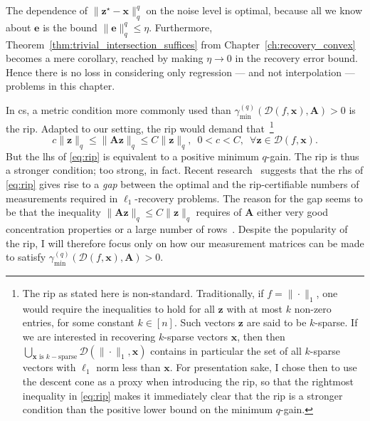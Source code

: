 The dependence of $\|\mathbf{z}^\star - \mathbf{x}\|_q^q$ on the noise level is optimal, because all we know about $\mathbf{e}$ is the bound $\|\mathbf{e}\|_q^{q} \leq \eta$. Furthermore, Theorem~\ref{thm:trivial_intersection_suffices} from Chapter~\ref{ch:recovery_convex} becomes a mere corollary, reached by making $\eta \to 0$ in the recovery error bound. Hence there is no loss in considering only regression --- and not interpolation --- problems in this chapter.

In \acrlong{cs}, a metric condition more commonly used than $\gamma_{\min}^{(q)} \left ( \mathcal{D}( f, \mathbf{x}), \mathbf{A} \right ) > 0$ is the \acrfull{rip}. Adapted to our setting, the \acrshort{rip} would demand that~\footnote{The \acrshort{rip} as stated here is non-standard. Traditionally, if $f = \|\cdot\|_1$, one would require the inequalities to hold for all $\mathbf{z}$ with at most $k$ non-zero entries, for some constant $k \in [n]$. Such vectors $\mathbf{z}$ are said to be $k$-sparse. If we are interested in recovering $k$-sparse vectors $\mathbf{x}$, then then $\bigcup_{\mathbf{x} \text{ is }k-\text{sparse}} \mathcal{D}( \| \cdot \|_1, \mathbf{x})$ contains in particular the set of all $k$-sparse vectors with $\ell_1$ norm less than $\mathbf{x}$. For presentation sake, I chose then to use the descent cone as a proxy when introducing the \acrshort{rip}, so that the rightmost inequality in \eqref{eq:rip} makes it immediately clear that the \acrshort{rip} is a stronger condition than the positive lower bound on the minimum $q$-gain.}
\begin{equation}
    c \|\mathbf{z}\|_q \leq \|\mathbf{Az}\|_q \leq C\|\mathbf{z}\|_q, \enspace 0< c < C, \enspace \forall \mathbf{z} \in \mathcal{D}( f, \mathbf{x}).
    \label{eq:rip}
\end{equation}
But the \acrlong{lhs} of \eqref{eq:rip} is equivalent to a positive minimum $q$-gain. The \acrshort{rip} is thus a stronger condition; too strong, in fact. Recent research~\cite{dirksen2018a} suggests that the \acrlong{rhs} of \eqref{eq:rip} gives rise to a \emph{gap} between the optimal and the \acrshort{rip}-certifiable numbers of measurements required in $\ell_1$-recovery problems. The reason for the gap seems to be that the inequality $\|\mathbf{Az}\|_q \leq C\|\mathbf{z}\|_q$ requires of $\mathbf{A}$ either very good concentration properties or a large number of rows~\cite{lecue2017}. Despite the popularity of the \acrshort{rip}, I will therefore focus only on how our measurement matrices can be made to satisfy $\gamma_{\min}^{(q)} \left ( \mathcal{D}( f, \mathbf{x}), \mathbf{A} \right ) > 0$.



